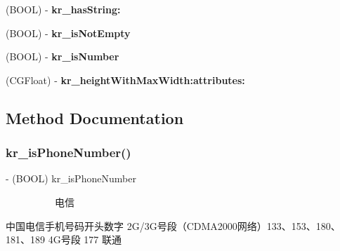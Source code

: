 \begin{DoxyCompactItemize}
\item 
\mbox{\label{category_n_s_string_07_k_r_kit_08_aba5c22e42ab074a478e6879777542cfb}} 
(B\+O\+OL) -\/ {\bfseries kr\+\_\+has\+String\+:}
\item 
\mbox{\label{category_n_s_string_07_k_r_kit_08_a49661bdc65175f32803552784ac9f808}} 
(B\+O\+OL) -\/ {\bfseries kr\+\_\+is\+Not\+Empty}
\item 
\mbox{\label{category_n_s_string_07_k_r_kit_08_a2a58d23ba251f2d5c6aad7177f44013d}} 
(B\+O\+OL) -\/ {\bfseries kr\+\_\+is\+Number}
\item 
\mbox{\label{category_n_s_string_07_k_r_kit_08_ac78c67dabe882ae9ddc558398c459874}} 
(C\+G\+Float) -\/ {\bfseries kr\+\_\+height\+With\+Max\+Width\+:attributes\+:}
\end{DoxyCompactItemize}


\subsection{Method Documentation}
\mbox{\label{category_n_s_string_07_k_r_kit_08_a8bf117f5e3fa8c301b33dd256175c962}} 
\subsubsection{\texorpdfstring{kr\+\_\+is\+Phone\+Number()}{kr\_isPhoneNumber()}}
{\footnotesize\ttfamily -\/ (B\+O\+OL) kr\+\_\+is\+Phone\+Number \begin{DoxyParamCaption}{ }\end{DoxyParamCaption}}

~\newline
~\newline
~\newline
~\newline
~\newline
~\newline
 电信

中国电信手机号码开头数字 2\+G/3\+G号段（\+C\+D\+M\+A2000网络）133、153、180、181、189 4\+G号段 177 联通

